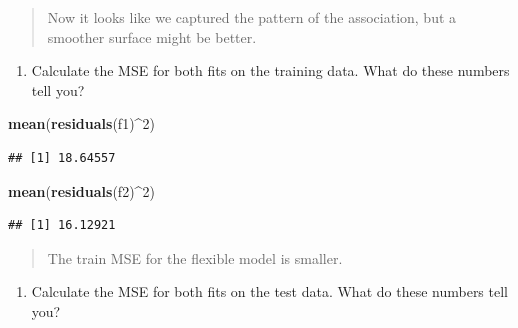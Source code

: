\documentclass[]{article}
\newenvironment{Shaded}{\begin{snugshade}}{\end{snugshade}}
\newcommand{\DecValTok}[1]{\textcolor[rgb]{0.00,0.00,0.81}{#1}}
\newcommand{\KeywordTok}[1]{\textcolor[rgb]{0.13,0.29,0.53}{\textbf{#1}}}
\newcommand{\NormalTok}[1]{#1}
\newcommand{\OperatorTok}[1]{\textcolor[rgb]{0.81,0.36,0.00}{\textbf{#1}}}
\newcommand{\StringTok}[1]{\textcolor[rgb]{0.31,0.60,0.02}{#1}}
\providecommand{\tightlist}{%
  \setlength{\itemsep}{0pt}\setlength{\parskip}{0pt}}
\begin{document}
\begin{quote}
Now it looks like we captured the pattern of the association, but a
smoother surface might be better.
\end{quote}

\begin{enumerate}
\def\labelenumi{(\alph{enumi})}
\setcounter{enumi}{5}
\tightlist
\item
  Calculate the MSE for both fits on the training data. What do these
  numbers tell you?
\end{enumerate}

\begin{Shaded}
\begin{Highlighting}[]
\KeywordTok{mean}\NormalTok{(}\KeywordTok{residuals}\NormalTok{(f1)}\OperatorTok{^}\DecValTok{2}\NormalTok{)}
\end{Highlighting}
\end{Shaded}

\begin{verbatim}
## [1] 18.64557
\end{verbatim}

\begin{Shaded}
\begin{Highlighting}[]
\KeywordTok{mean}\NormalTok{(}\KeywordTok{residuals}\NormalTok{(f2)}\OperatorTok{^}\DecValTok{2}\NormalTok{)}
\end{Highlighting}
\end{Shaded}

\begin{verbatim}
## [1] 16.12921
\end{verbatim}

\begin{quote}
The train MSE for the flexible model is smaller.
\end{quote}

\begin{enumerate}
\def\labelenumi{(\alph{enumi})}
\setcounter{enumi}{6}
\tightlist
\item
  Calculate the MSE for both fits on the test data. What do these
  numbers tell you?
\end{enumerate}

\begin{Shaded}
\end{Shaded}
\end{document}
